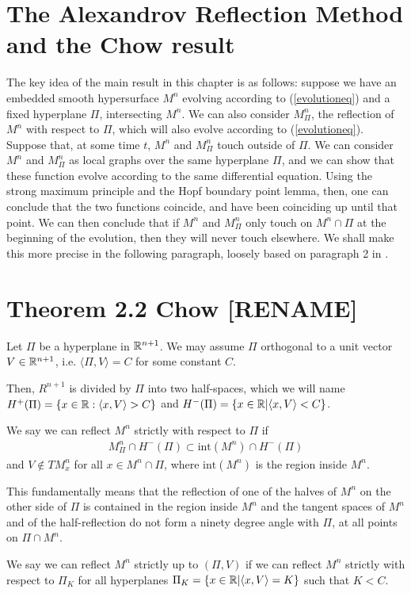 \section{The Alexandrov Reflection Method and the Chow result}


The key idea of the main result in this chapter is as follows: suppose we have an embedded smooth hypersurface $M^n$ evolving according to (\ref{evolutioneq}) and a fixed hyperplane $\Pi$, intersecting $M^n$. We can also consider $M^n_\Pi$, the reflection of $M^n$ with respect to $\Pi$, which will also evolve according to (\ref{evolutioneq}). Suppose that, at some time $t$, $M^n$ and  $M^n_\Pi$ touch outside of $\Pi$. We can consider $M^n$ and  $M^n_\Pi$ as local graphs over the same hyperplane $\Pi$, and we can show that these function evolve according to the same differential equation. Using the strong maximum principle and the Hopf boundary point lemma, then, one can conclude that the two functions coincide, and have been coinciding up until that point. We can then conclude that if  $M^n$ and  $M^n_\Pi$ only touch on $M^n\cap\Pi$ at the beginning of the evolution, then they will never touch elsewhere. We shall make this more precise in the following paragraph, loosely based on paragraph 2 in \cite{Chow}. 

\section{Theorem 2.2 Chow [RENAME]}



Let $\Pi$ be a hyperplane in $\mathbb{R}^{n+1}$. We may assume $\Pi$ orthogonal to a unit vector $V\in\mathbb{R}^{n+1}$, i.e. $\langle\Pi, V\rangle= C$ for some constant $C$. 

Then, $R^{n+1}$ is divided by $\Pi$ into two half-spaces, which we will name  $H^+(\Pi)=\{x \in \mathbb{R} : \langle x, V\rangle > C\}$ and  $H^-(\Pi)=\{x \in \mathbb{R} | \langle x, V\rangle < C\}$. 

\begin{defin}
	We say we can reflect $M^n$ strictly with respect to $\Pi$ if 
	\begin{align*}
		M^n_\Pi\cap H^-(\Pi)\subset \mathrm{int}(M^n)\cap H^-(\Pi)
	\end{align*} 
	and $V\notin TM^n_x$ for all $x\in M^n \cap\Pi$, where $\mathrm{int}(M^n)$ is the region inside $M^n$. 
\end{defin}
This fundamentally means that the reflection of one of the halves of $M^n$ on the other side of $\Pi$ is contained in the region inside $M^n$ and the tangent spaces of $M^n$ and of the half-reflection do not form a ninety degree angle with $\Pi$, at all points on $\Pi\cap M^n$. 
\begin{defin}
	We say we can reflect $M^n$ strictly up to $(\Pi,V)$ if we can reflect $M^n$ strictly with respect to $\Pi_K$ for all hyperplanes $\Pi_K=\{x \in \mathbb{R} | \langle x, V\rangle = K\}$ such that $K<C$.  
\end{defin}

